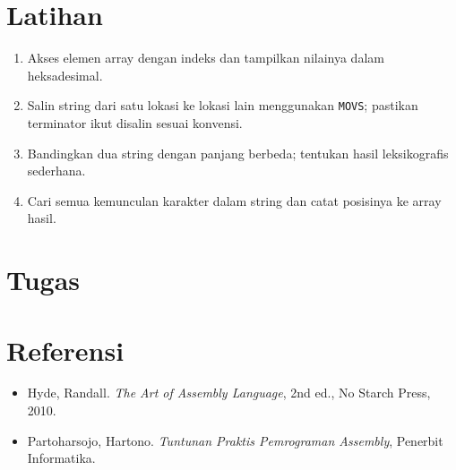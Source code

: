 \section{Latihan}
\begin{enumerate}
  \item Akses elemen array dengan indeks dan tampilkan nilainya dalam heksadesimal.
  \item Salin string dari satu lokasi ke lokasi lain menggunakan \texttt{MOVS}; pastikan terminator ikut disalin sesuai konvensi.
  \item Bandingkan dua string dengan panjang berbeda; tentukan hasil leksikografis sederhana.
  \item Cari semua kemunculan karakter dalam string dan catat posisinya ke array hasil.
\end{enumerate}

\section{Tugas}

\section{Referensi}
\begin{itemize}
  \item Hyde, Randall. \textit{The Art of Assembly Language}, 2nd ed., No Starch Press, 2010.
  \item Partoharsojo, Hartono. \textit{Tuntunan Praktis Pemrograman Assembly}, Penerbit Informatika.
\end{itemize}
